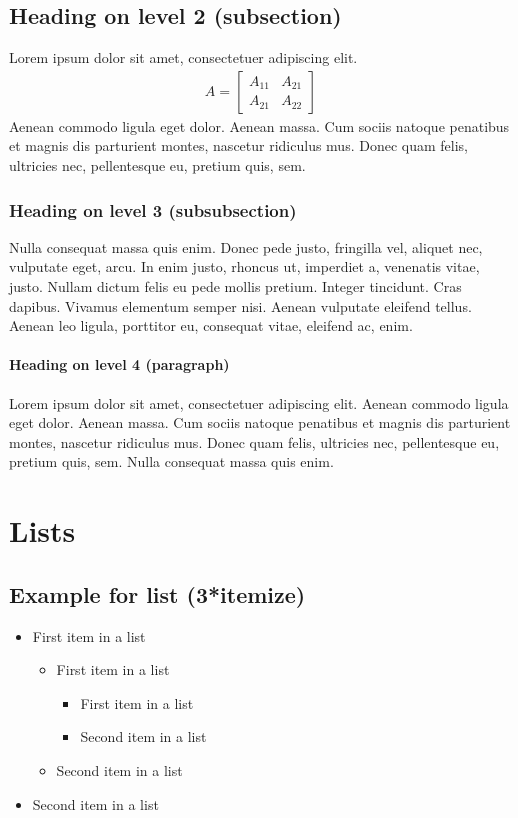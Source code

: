 \documentclass[paper=a4, fontsize=11pt]{scrartcl}
\numberwithin{equation}{section}		%
\numberwithin{figure}{section}			%
\numberwithin{table}{section}				%
\begin{document}
\subsection{Heading on level 2 (subsection)}
Lorem ipsum dolor sit amet, consectetuer adipiscing elit. 
\begin{align}
	A =  
	\begin{bmatrix}
	A_{11} & A_{21} \\
  	A_{21} & A_{22}
	\end{bmatrix}
\end{align}
Aenean commodo ligula eget dolor. Aenean massa. Cum sociis natoque penatibus et magnis dis parturient montes, nascetur ridiculus mus. Donec quam felis, ultricies nec, pellentesque eu, pretium quis, sem.

\subsubsection{Heading on level 3 (subsubsection)}
Nulla consequat massa quis enim. Donec pede justo, fringilla vel, aliquet nec, vulputate eget, arcu. In enim justo, rhoncus ut, imperdiet a, venenatis vitae, justo. Nullam dictum felis eu pede mollis pretium. Integer tincidunt. Cras dapibus. Vivamus elementum semper nisi. Aenean vulputate eleifend tellus. Aenean leo ligula, porttitor eu, consequat vitae, eleifend ac, enim.

\paragraph{Heading on level 4 (paragraph)}
Lorem ipsum dolor sit amet, consectetuer adipiscing elit. Aenean commodo ligula eget dolor. Aenean massa. Cum sociis natoque penatibus et magnis dis parturient montes, nascetur ridiculus mus. Donec quam felis, ultricies nec, pellentesque eu, pretium quis, sem. Nulla consequat massa quis enim. 


\section{Lists}

\subsection{Example for list (3*itemize)}
\begin{itemize}
	\item First item in a list 
		\begin{itemize}
		\item First item in a list 
			\begin{itemize}
			\item First item in a list 
			\item Second item in a list 
			\end{itemize}
		\item Second item in a list 
		\end{itemize}
	\item Second item in a list 
\end{itemize}
\end{document}
